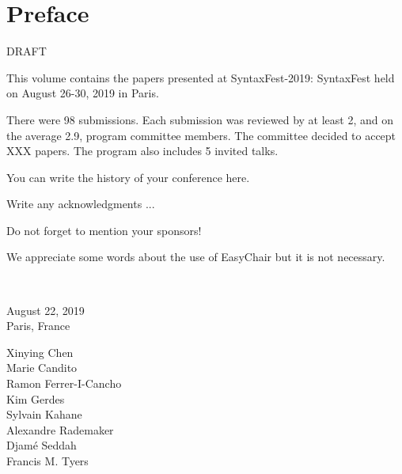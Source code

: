 \documentclass[procedia]{easychair}
\begin{document}
\section*{Preface}
DRAFT



This volume contains the papers presented at SyntaxFest-2019: SyntaxFest held on August 26-30, 2019 in Paris.



There were 98 submissions. Each submission was reviewed by at least 2, and on the average 2.9, program committee members. The committee decided to accept XXX papers. The program also includes 5 invited talks.



You can write the history of your conference here.



Write any acknowledgments ...



Do not forget to mention your sponsors!



We appreciate some words about the use of EasyChair but it is not necessary.



~\bigskip


\noindent
\begin{minipage}[t]{.4\textwidth}
August 22, 2019\\
Paris, France
\end{minipage}%
\hfill
\begin{minipage}[t]{.4\textwidth}\flushright
Xinying Chen\\
Marie Candito\\
Ramon Ferrer-I-Cancho\\
Kim Gerdes\\
Sylvain Kahane\\
Alexandre Rademaker\\
Djam\'e Seddah\\
Francis M. Tyers
\end{minipage}
\end{document}
